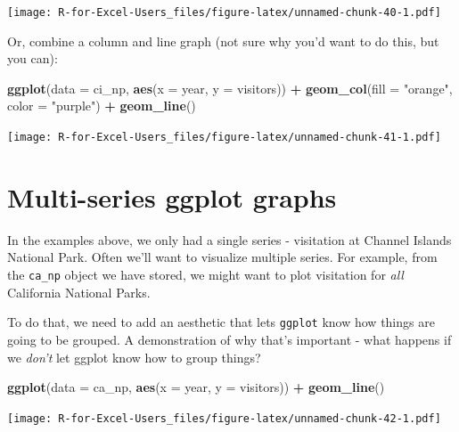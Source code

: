 \documentclass[]{book}
\newenvironment{Shaded}{\begin{snugshade}}{\end{snugshade}}
\newcommand{\DataTypeTok}[1]{\textcolor[rgb]{0.13,0.29,0.53}{#1}}
\newcommand{\KeywordTok}[1]{\textcolor[rgb]{0.13,0.29,0.53}{\textbf{#1}}}
\newcommand{\NormalTok}[1]{#1}
\newcommand{\OperatorTok}[1]{\textcolor[rgb]{0.81,0.36,0.00}{\textbf{#1}}}
\newcommand{\StringTok}[1]{\textcolor[rgb]{0.31,0.60,0.02}{#1}}
\begin{document}
\texttt{[image: R-for-Excel-Users\_files/figure-latex/unnamed-chunk-40-1.pdf]}

Or, combine a column and line graph (not sure why you'd want to do this, but you can):

\begin{Shaded}
\begin{Highlighting}[]
\KeywordTok{ggplot}\NormalTok{(}\DataTypeTok{data =}\NormalTok{ ci_np, }\KeywordTok{aes}\NormalTok{(}\DataTypeTok{x =}\NormalTok{ year, }\DataTypeTok{y =}\NormalTok{ visitors)) }\OperatorTok{+}
\StringTok{  }\KeywordTok{geom_col}\NormalTok{(}\DataTypeTok{fill =} \StringTok{"orange"}\NormalTok{,}
           \DataTypeTok{color =} \StringTok{"purple"}\NormalTok{) }\OperatorTok{+}
\StringTok{  }\KeywordTok{geom_line}\NormalTok{()}
\end{Highlighting}
\end{Shaded}

\texttt{[image: R-for-Excel-Users\_files/figure-latex/unnamed-chunk-41-1.pdf]}

\hypertarget{multi-series-ggplot-graphs}{%
\section{Multi-series ggplot graphs}\label{multi-series-ggplot-graphs}}

In the examples above, we only had a single series - visitation at Channel Islands National Park. Often we'll want to visualize multiple series. For example, from the \texttt{ca\_np} object we have stored, we might want to plot visitation for \emph{all} California National Parks.

To do that, we need to add an aesthetic that lets \texttt{ggplot} know how things are going to be grouped. A demonstration of why that's important - what happens if we \emph{don't} let ggplot know how to group things?

\begin{Shaded}
\begin{Highlighting}[]
\KeywordTok{ggplot}\NormalTok{(}\DataTypeTok{data =}\NormalTok{ ca_np, }\KeywordTok{aes}\NormalTok{(}\DataTypeTok{x =}\NormalTok{ year, }\DataTypeTok{y =}\NormalTok{ visitors)) }\OperatorTok{+}
\StringTok{  }\KeywordTok{geom_line}\NormalTok{()}
\end{Highlighting}
\end{Shaded}

\texttt{[image: R-for-Excel-Users\_files/figure-latex/unnamed-chunk-42-1.pdf]}
\end{document}
